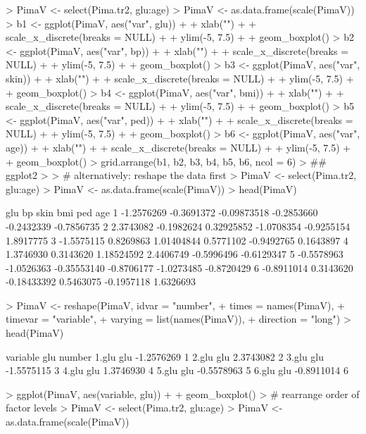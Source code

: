 \documentclass[12pt,letterpaper,final]{article}
\begin{document}
\begin{Schunk}
\begin{Sinput}
> PimaV <- select(Pima.tr2, glu:age)
> PimaV <- as.data.frame(scale(PimaV))
> b1 <- ggplot(PimaV, aes("var", glu)) +
+   xlab("") +
+   scale_x_discrete(breaks = NULL) +
+   ylim(-5, 7.5) +
+   geom_boxplot()
> b2 <- ggplot(PimaV, aes("var", bp)) +
+   xlab("") +
+   scale_x_discrete(breaks = NULL) +
+   ylim(-5, 7.5) +
+   geom_boxplot()
> b3 <- ggplot(PimaV, aes("var", skin)) +
+   xlab("") +
+   scale_x_discrete(breaks = NULL) +
+   ylim(-5, 7.5) +
+   geom_boxplot()
> b4 <- ggplot(PimaV, aes("var", bmi)) +
+   xlab("") +
+   scale_x_discrete(breaks = NULL) +
+   ylim(-5, 7.5) +
+   geom_boxplot()
> b5 <- ggplot(PimaV, aes("var", ped)) +
+   xlab("") +
+   scale_x_discrete(breaks = NULL) +
+   ylim(-5, 7.5) +
+   geom_boxplot()
> b6 <- ggplot(PimaV, aes("var", age)) +
+   xlab("") +
+   scale_x_discrete(breaks = NULL) +
+   ylim(-5, 7.5) +
+   geom_boxplot()
> grid.arrange(b1, b2, b3, b4, b5, b6, ncol = 6)
> ## ggplot2
> 
> # alternatively: reshape the data first
> PimaV <- select(Pima.tr2, glu:age)
> PimaV <- as.data.frame(scale(PimaV))
> head(PimaV)
\end{Sinput}
\begin{Soutput}
         glu         bp        skin        bmi        ped        age
1 -1.2576269 -0.3691372 -0.09873518 -0.2853660 -0.2432339 -0.7856735
2  2.3743082 -0.1982624  0.32925852 -1.0708354 -0.9255154  1.8917775
3 -1.5575115  0.8269863  1.01404844  0.5771102 -0.9492765  0.1643897
4  1.3746930  0.3143620  1.18524592  2.4406749 -0.5996496 -0.6129347
5 -0.5578963 -1.0526363 -0.35553140 -0.8706177 -1.0273485 -0.8720429
6 -0.8911014  0.3143620 -0.18433392  0.5463075 -0.1957118  1.6326693
\end{Soutput}
\begin{Sinput}
> PimaV <- reshape(PimaV, idvar = "number", 
+                  times = names(PimaV), 
+                  timevar = "variable", 
+                  varying = list(names(PimaV)), 
+                  direction = "long")
> head(PimaV)
\end{Sinput}
\begin{Soutput}
      variable        glu number
1.glu      glu -1.2576269      1
2.glu      glu  2.3743082      2
3.glu      glu -1.5575115      3
4.glu      glu  1.3746930      4
5.glu      glu -0.5578963      5
6.glu      glu -0.8911014      6
\end{Soutput}
\begin{Sinput}
> ggplot(PimaV, aes(variable, glu)) +
+   geom_boxplot()
> # rearrange order of factor levels
> PimaV <- select(Pima.tr2, glu:age)
> PimaV <- as.data.frame(scale(PimaV))

\end{Sinput}
\end{Schunk}
\end{document}
